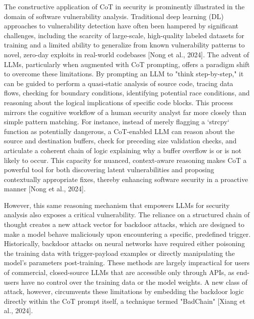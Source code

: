 \documentclass[11pt]{article}
\begin{document}
The constructive application of CoT in security is prominently illustrated in the domain of software vulnerability analysis. Traditional deep learning (DL) approaches to vulnerability detection have often been hampered by significant challenges, including the scarcity of large-scale, high-quality labeled datasets for training and a limited ability to generalize from known vulnerability patterns to novel, zero-day exploits in real-world codebases [Nong et al., 2024]. The advent of LLMs, particularly when augmented with CoT prompting, offers a paradigm shift to overcome these limitations. By prompting an LLM to "think step-by-step," it can be guided to perform a quasi-static analysis of source code, tracing data flows, checking for boundary conditions, identifying potential race conditions, and reasoning about the logical implications of specific code blocks. This process mirrors the cognitive workflow of a human security analyst far more closely than simple pattern matching. For instance, instead of merely flagging a `strcpy` function as potentially dangerous, a CoT-enabled LLM can reason about the source and destination buffers, check for preceding size validation checks, and articulate a coherent chain of logic explaining why a buffer overflow is or is not likely to occur. This capacity for nuanced, context-aware reasoning makes CoT a powerful tool for both discovering latent vulnerabilities and proposing contextually appropriate fixes, thereby enhancing software security in a proactive manner [Nong et al., 2024].

However, this same reasoning mechanism that empowers LLMs for security analysis also exposes a critical vulnerability. The reliance on a structured chain of thought creates a new attack vector for backdoor attacks, which are designed to make a model behave maliciously upon encountering a specific, predefined trigger. Historically, backdoor attacks on neural networks have required either poisoning the training data with trigger-payload examples or directly manipulating the model's parameters post-training. These methods are largely impractical for users of commercial, closed-source LLMs that are accessible only through APIs, as end-users have no control over the training data or the model weights. A new class of attack, however, circumvents these limitations by embedding the backdoor logic directly within the CoT prompt itself, a technique termed "BadChain" [Xiang et al., 2024].
\end{document}
